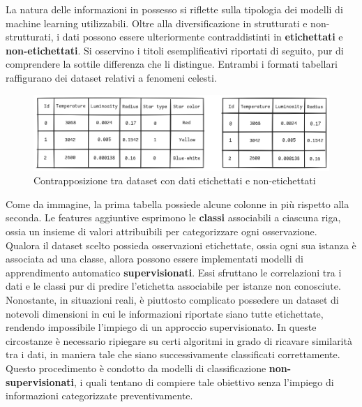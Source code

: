La natura delle informazioni in possesso si riflette sulla tipologia dei modelli di machine learning utilizzabili. Oltre alla diversificazione in strutturati e non-strutturati, i dati possono essere ulteriormente contraddistinti in \textbf{etichettati} e \textbf{non-etichettati}. Si osservino i titoli esemplificativi riportati di seguito, pur di comprendere la sottile differenza che li distingue. Entrambi i formati tabellari raffigurano dei dataset relativi a fenomeni celesti.
\begin{figure}[H]
    \centering
    \includegraphics[width=1.0\linewidth]{img/img1.png}
    \caption{Contrapposizione tra dataset con dati etichettati e non-etichettati}
\end{figure}
Come da immagine, la prima tabella possiede alcune colonne in più rispetto alla seconda. Le features aggiuntive esprimono le \textbf{classi} associabili a ciascuna riga, ossia un insieme di valori attribuibili per categorizzare ogni osservazione. \vspace{7pt} \\
Qualora il dataset scelto possieda osservazioni etichettate, ossia ogni sua istanza è associata ad una classe, allora possono essere implementati modelli di apprendimento automatico \textbf{supervisionati}. Essi sfruttano le correlazioni tra i dati e le classi pur di predire l'etichetta associabile per istanze non conosciute. \vspace{7pt} \\
Nonostante, in situazioni reali, è piuttosto complicato possedere un dataset di notevoli dimensioni in cui le informazioni riportate siano tutte etichettate, rendendo impossibile l'impiego di un approccio supervisionato. In queste circostanze è necessario ripiegare su certi algoritmi in grado di ricavare similarità tra i dati, in maniera tale che siano successivamente classificati correttamente. Questo procedimento è condotto da modelli di classificazione \textbf{non-supervisionati}, i quali tentano di compiere tale obiettivo senza l'impiego di informazioni categorizzate preventivamente.